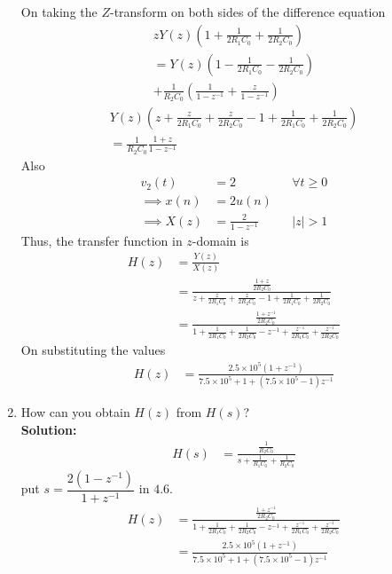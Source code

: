 \documentclass[journal,12pt,twocolumn]{IEEEtran}
\newcommand{\solution}{\noindent \textbf{Solution: }}
\providecommand{\brak}[1]{\ensuremath{\left(#1\right)}}
\providecommand{\abs}[1]{\left\vert#1\right\vert}
\numberwithin{equation}{section}
\renewcommand\thesection{\arabic{section}}
\begin{document}
\begin{enumerate}[label=\arabic*.,ref=\thesection.\theenumi]
	On taking the $Z$-transform on both sides of the difference equation
	\begin{multline}
		zY(z)\brak{1 + \frac{1}{2R_1C_0} + \frac{1}{2R_2C_0}} \\= Y(z)\brak{1 - \frac{1}{2R_1C_0} - \frac{1}{2R_2C_0}} \\+ \frac{1}{R_2C_0} \brak{\frac{1}{1-z^{-1}} + \frac{z}{1-z^{-1}}}
	\end{multline}
	\begin{multline}
		Y(z)\brak{z + \frac{z}{2R_1C_0} + \frac{z}{2R_2C_0} - 1 + \frac{1}{2R_1C_0} + \frac{1}{2R_2C_0}} \\
		= \frac{1}{R_2C_0} \frac{1+z}{1-z^{-1}}
	\end{multline}
	Also
	\begin{align}
		v_2(t) &= 2 &&\forall t \ge 0\\
		\implies x(n) &= 2u(n) \\
		\implies X(z) &= \frac{2}{1-z^{-1}} &&\abs{z} > 1
	\end{align}
	Thus, the transfer function in $z$-domain is
	\begin{align}
		H(z) &= \frac{Y(z)}{X(z)} \\
		&= \frac{\frac{1+z}{2R_2C_0}}{z + \frac{z}{2R_1C_0} + \frac{z}{2R_2C_0} - 1 + \frac{1}{2R_1C_0} + \frac{1}{2R_2C_0}} \\
		&= \frac{\frac{1 + z^{-1}}{2R_2C_0}}{1 + \frac{1}{2R_1C_0} + \frac{1}{2R_2C_0} - z^{-1} + \frac{z^{-1}}{2R_1C_0} + \frac{z^{-1}}{2R_2C_0}}
	\end{align}
	On substituting the values
	\begin{align}
		H(z) &= \frac{2.5\times10^5 (1+z^{-1})}{7.5\times10^5 + 1 + (7.5\times10^5 - 1)z^{-1}}
	\end{align}
	\item How can you obtain $H(z)$ from $H(s)$?\\
	\solution
	\begin{align}
		H(s) &= \frac{\frac{1}{R_2C_0}}{s + \frac{1}{R_1C_0} + \frac{1}{R_2C_0}}
	\end{align}
		put $s=\dfrac{2(1-z^{-1})}{1+z^{-1}}$ in $4.6$.
	\begin{align}
		H(z) &= \frac{\frac{1 + z^{-1}}{2R_2C_0}}{1 + \frac{1}{2R_1C_0} + \frac{1}{2R_2C_0} - z^{-1} + \frac{z^{-1}}{2R_1C_0} + \frac{z^{-1}}{2R_2C_0}} \\
		&= \frac{2.5\times10^5 (1+z^{-1})}{7.5\times10^5 + 1 + (7.5\times10^5 - 1)z^{-1}}
	\end{align}	
	\end{enumerate}
\end{document}
